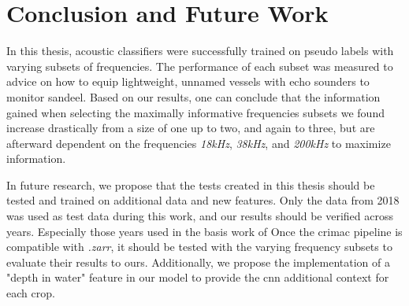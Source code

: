 \chapter{Conclusion and Future Work}
    In this thesis, acoustic classifiers were successfully trained on pseudo labels with varying subsets of frequencies. The performance of each subset was measured to advice on how to equip lightweight, unnamed vessels with echo sounders to monitor sandeel. Based on our results, one can conclude that the information gained when selecting the maximally informative frequencies subsets we found increase drastically from a size of one up to two, and again to three, but are afterward dependent on the frequencies \textit{18kHz}, \textit{38kHz}, and \textit{200kHz} to maximize information.
    
    
    

    
    In future research, we propose that the tests created in this thesis should be tested and trained on additional data and new features. Only the data from 2018 was used as test data during this work, and our results should be verified across years. Especially those years used in the basis work of \citeauthor{brautaset2020acoustic} Once the \gls{crimac} pipeline is compatible with \textit{.zarr}, it should be tested with the varying frequency subsets to evaluate their results to ours. Additionally, we propose the implementation of a "depth in water" feature in our model to provide the \gls{cnn} additional context for each crop.
    
